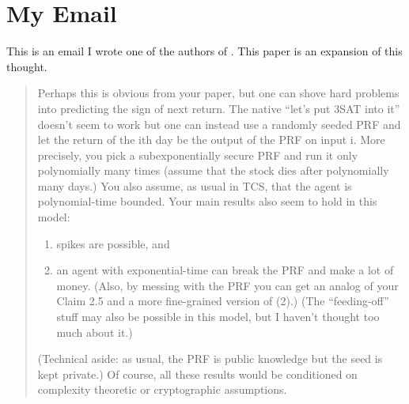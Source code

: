 \documentclass[11pt]{article}
\theoremstyle{definition}
\begin{document}



\newpage
\appendix
\section{My Email}

This is an email I wrote one of the authors of \cite{HasanhodzicLV11}. This
paper is an expansion of this thought.

\begin{quote}
    Perhaps this is obvious from your paper, but one can shove hard problems
    into predicting the sign of next return. The native “let’s put 3SAT into it”
    doesn't seem to work but one can instead use a randomly seeded PRF and let
    the return of the ith day be the output of the PRF on input i.  More
    precisely, you pick a subexponentially secure PRF and run it only
    polynomially many times (assume that the stock dies after polynomially many
    days.) You also assume, as usual in TCS, that the agent is polynomial-time
    bounded.  Your main results also seem to hold in this model:
    \begin{enumerate}
        \item spikes are possible, and 
        \item an agent with exponential-time can break the PRF and make a lot of
            money. (Also, by messing with the PRF you can get an analog of your
            Claim 2.5 and a more fine-grained version of (2).) (The
            “feeding-off” stuff may also be possible in this model, but I
            haven’t thought too much about it.) 
    \end{enumerate}
    (Technical aside: as usual, the PRF is public knowledge but the seed is kept
    private.) Of course, all these results would be conditioned on complexity
    theoretic or cryptographic assumptions. 
\end{quote}
\end{document}

